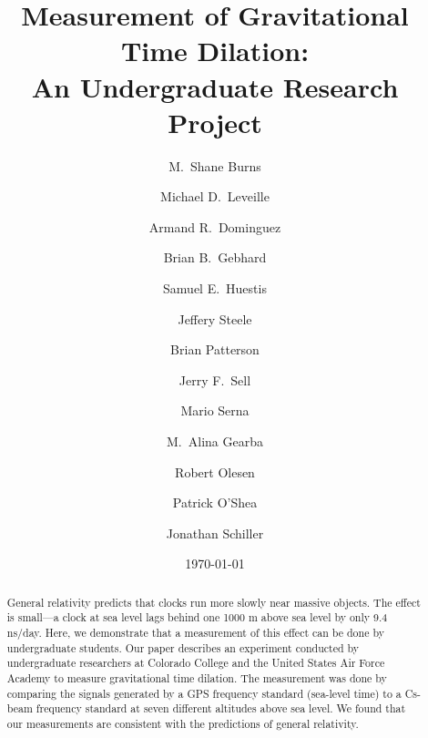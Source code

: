\documentclass[prb,preprint]{revtex4-1}
\begin{document}

\title{Measurement of Gravitational Time Dilation: \\An Undergraduate Research Project}

\author{M.\ Shane Burns}
\author{Michael D.\ Leveille}
\author{Armand R.\ Dominguez}
\author{Brian B.\ Gebhard}
\author{Samuel E.\ Huestis}
\author{Jeffery Steele}

\author{Brian Patterson}
\author{Jerry F.\ Sell}
\author{Mario Serna}
\author{M.\ Alina Gearba}
\author{Robert Olesen}
\author{Patrick O'Shea}
\author{Jonathan Schiller}


\date{\today}

\begin{abstract}
General relativity predicts that clocks run more slowly near massive objects. The effect is small---a clock at sea level lags behind one 1000 m above sea level by only 9.4 ns/day.  Here, we demonstrate that a measurement of this effect can be done by undergraduate students. Our paper describes an experiment conducted by undergraduate researchers at Colorado College and the United States Air Force Academy to measure gravitational time dilation. The measurement was done by comparing the signals generated by a GPS frequency standard (sea-level time) to a Cs-beam frequency standard at seven different altitudes above sea level.  We found that our measurements are consistent with the predictions of general relativity. 
\end{abstract}

\maketitle %
\end{document}
